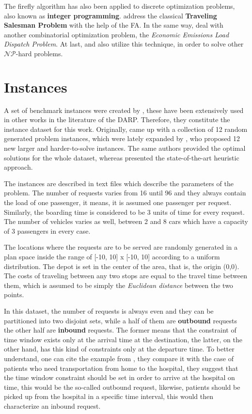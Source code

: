 \documentclass[tuberlin,cic,tc,openright,english,noabntcite,oneside]{iiufrgs}
\begin{document}
The firefly algorithm has also been applied to discrete optimization problems, also known as \textbf{integer programming}. \textcite{jati_evolutionary_2011} address the classical \textbf{Traveling Salesman Problem} with the help of the FA. In the same way, \textcite{apostolopoulos_application_2010} deal with another combinatorial optimization problem, the \emph{Economic Emissions Load Dispatch Problem}. At last, \textcite{sayadi_discrete_2010} and \textcite{sayadi_firefly-inspired_2013} also utilize this technique, in order to solve other $\mathcal{NP}$-hard problems.

\section{Instances}
A set of benchmark instances were created by \textcite{cordeau_branch-and-cut_2006}, these have been extensively used in other works in the literature of the DARP. Therefore, they constitute the instance dataset for this work. Originally, \textcite{cordeau_branch-and-cut_2006} came up with a collection of 12 random generated problem instances, which were lately expanded by \textcite{ropke_models_2007}, who proposed 12 new larger and harder-to-solve instances. The same authors provided the optimal solutions for the whole dataset, whereas \textcite{parragh_hybrid_2013} presented the state-of-the-art heuristic approach.

The instances are described in text files which describe the parameters of the problem. The number of requests varies from 16 until 96 and they always contain the load of one passenger, it means, it is assumed one passenger per request. Similarly, the boarding time is considered to be 3 units of time for every request. The number of vehicles varies as well, between 2 and 8 cars which have a capacity of 3 passengers in every case.

The locations where the requests are to be served are randomly generated in a plan space inside the range of [-10, 10] x [-10, 10] according to a uniform distribution. The depot is set in the center of the area, that is, the origin (0,0). The costs of traveling between any two stops are equal to the travel time between them, which is assumed to be simply the \emph{Euclidean distance} between the two points.

In this dataset, the number of requests is always even and they can be partitioned into two disjoint sets, while a half of them are \textbf{outbound} requests the other half are \textbf{inbound} requests. The former means that the constraint of time window exists only at the arrival time at the destination, the latter, on the other hand, has this kind of constraints only at the departure time. To better understand, one can cite the example from \textcite[p. 29]{cordeau_dial--ride_2007}, they compare it with the case of patients who need transportation from home to the hospital, they suggest that the time window constraint should be set in order to arrive at the hospital on time, this would be the so-called outbound request, likewise, patients should be picked up from the hospital in a specific time interval, this would then characterize an inbound request.
\end{document}
